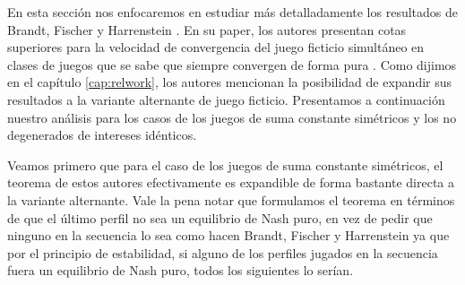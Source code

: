 En esta sección nos enfocaremos en estudiar más detalladamente los resultados de Brandt, Fischer y Harrenstein \cite{brandt:rate:convergence}. En su paper, los autores presentan cotas superiores para la velocidad de convergencia del juego ficticio simultáneo en clases de juegos que se sabe que siempre convergen de forma pura . Como dijimos en el capítulo \ref{cap:relwork}, los autores mencionan la posibilidad de expandir sus resultados a la variante alternante de juego ficticio. Presentamos a continuación nuestro análisis para los casos de los juegos de suma constante simétricos y los no degenerados de intereses idénticos.



Veamos primero que para el caso de los juegos de suma constante simétricos, el teorema de estos autores efectivamente es expandible de forma bastante directa a la variante alternante. Vale la pena notar que formulamos el teorema en términos de que el último perfil no sea un equilibrio de Nash puro, en vez de pedir que ninguno en la secuencia lo sea como hacen Brandt, Fischer y Harrenstein ya que por el principio de estabilidad, si alguno de los perfiles jugados en la secuencia fuera un equilibrio de Nash puro, todos los siguientes lo serían.

